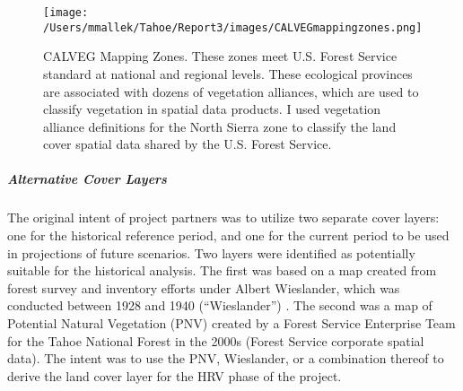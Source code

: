 \begin{wrapfigure}{R}{0.5\textwidth} %
\texttt{[image: /Users/mmallek/Tahoe/Report3/images/CALVEGmappingzones.png]}
\caption{\small CALVEG Mapping Zones. These zones meet U.S. Forest Service standard at national and regional levels. These ecological provinces are associated with dozens of vegetation alliances, which are used to classify vegetation in spatial data products. I used vegetation alliance definitions for the North Sierra zone to classify the land cover spatial data shared by the U.S. Forest Service.} 
\label{calveg}
\end{wrapfigure}

\subparagraph*{Alternative Cover Layers}
The original intent of project partners was to utilize two separate cover layers: one for the historical reference period, and one for the current period to be used in projections of future scenarios. Two layers were identified as potentially suitable for the historical analysis. The first was based on a map created from forest survey and inventory efforts under Albert Wieslander, which was conducted between 1928 and 1940 (``Wieslander'') \citep{Thorne2006}. The second was a map of Potential Natural Vegetation (PNV) created by a Forest Service Enterprise Team for the Tahoe National Forest in the 2000s (Forest Service corporate spatial data). The intent was to use the PNV, Wieslander, or a combination thereof to derive the land cover layer for the HRV phase of the project. 

